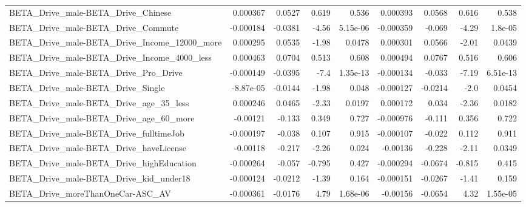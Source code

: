 \begin{tabular}{lrrrrrrrr}
BETA\_Drive\_male-BETA\_Drive\_Chinese                 &    0.000367 &       0.0527 &     0.619 &    0.536 &   0.000393 &      0.0568 &        0.616 &         0.538 \\
BETA\_Drive\_male-BETA\_Drive\_Commute                 &   -0.000184 &      -0.0381 &     -4.56 & 5.15e-06 &  -0.000359 &      -0.069 &        -4.29 &       1.8e-05 \\
BETA\_Drive\_male-BETA\_Drive\_Income\_12000\_more       &    0.000295 &       0.0535 &     -1.98 &   0.0478 &   0.000301 &      0.0566 &        -2.01 &        0.0439 \\
BETA\_Drive\_male-BETA\_Drive\_Income\_4000\_less        &    0.000463 &       0.0704 &     0.513 &    0.608 &   0.000494 &      0.0767 &        0.516 &         0.606 \\
BETA\_Drive\_male-BETA\_Drive\_Pro\_Drive               &   -0.000149 &      -0.0395 &      -7.4 & 1.35e-13 &  -0.000134 &      -0.033 &        -7.19 &      6.51e-13 \\
BETA\_Drive\_male-BETA\_Drive\_Single                  &   -8.87e-05 &      -0.0144 &     -1.98 &    0.048 &  -0.000127 &     -0.0214 &         -2.0 &        0.0454 \\
BETA\_Drive\_male-BETA\_Drive\_age\_35\_less             &    0.000246 &       0.0465 &     -2.33 &   0.0197 &   0.000172 &       0.034 &        -2.36 &        0.0182 \\
BETA\_Drive\_male-BETA\_Drive\_age\_60\_more             &    -0.00121 &       -0.133 &     0.349 &    0.727 &  -0.000976 &      -0.111 &        0.356 &         0.722 \\
BETA\_Drive\_male-BETA\_Drive\_fulltimeJob             &   -0.000197 &       -0.038 &     0.107 &    0.915 &  -0.000107 &      -0.022 &        0.112 &         0.911 \\
BETA\_Drive\_male-BETA\_Drive\_haveLicense             &    -0.00118 &       -0.217 &     -2.26 &    0.024 &   -0.00136 &      -0.228 &        -2.11 &        0.0349 \\
BETA\_Drive\_male-BETA\_Drive\_highEducation           &   -0.000264 &       -0.057 &    -0.795 &    0.427 &  -0.000294 &     -0.0674 &       -0.815 &         0.415 \\
BETA\_Drive\_male-BETA\_Drive\_kid\_under18             &   -0.000124 &      -0.0212 &     -1.39 &    0.164 &  -0.000151 &     -0.0267 &        -1.41 &         0.159 \\
BETA\_Drive\_moreThanOneCar-ASC\_AV                   &   -0.000361 &      -0.0176 &      4.79 & 1.68e-06 &   -0.00156 &     -0.0654 &         4.32 &      1.55e-05 \\

\end{tabular}
